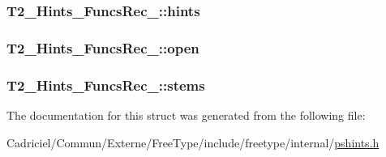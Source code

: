 \hypertarget{struct_t2___hints___funcs_rec___af8daab694889bede5a513fbae5f86e25}{
\subsubsection[{hints}]{ T2\-\_\-\-Hints\-\_\-\-Funcs\-Rec\-\_\-\-::hints}}\label{struct_t2___hints___funcs_rec___af8daab694889bede5a513fbae5f86e25}
\hypertarget{struct_t2___hints___funcs_rec___a1a5e0b296ee2e2ae6711b3ee35e5fcd9}{
\subsubsection[{open}]{ T2\-\_\-\-Hints\-\_\-\-Funcs\-Rec\-\_\-\-::open}}\label{struct_t2___hints___funcs_rec___a1a5e0b296ee2e2ae6711b3ee35e5fcd9}
\hypertarget{struct_t2___hints___funcs_rec___a12bfd8bae5d3df8f570fcdfb70c00139}{
\subsubsection[{stems}]{ T2\-\_\-\-Hints\-\_\-\-Funcs\-Rec\-\_\-\-::stems}}\label{struct_t2___hints___funcs_rec___a12bfd8bae5d3df8f570fcdfb70c00139}


The documentation for this struct was generated from the following file\-:\begin{DoxyCompactItemize}
\item 
Cadriciel/\-Commun/\-Externe/\-Free\-Type/include/freetype/internal/\hyperlink{pshints_8h}{pshints.\-h}\end{DoxyCompactItemize}

